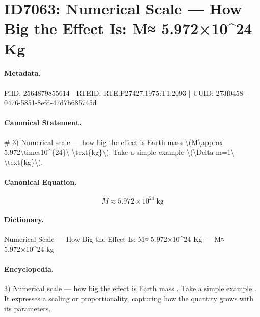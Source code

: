 \section*{ID7063: Numerical Scale — How Big the Effect Is: M≈ 5.972×10\textasciicircum{}24 Kg}
\paragraph{Metadata.}
PiID: 2564879855614 | RTEID: RTE:P27427.1975:T1.2093 | UUID: 273f0458-0476-5851-8efd-47d7b685745d

\paragraph{Canonical Statement.}
\# 3) Numerical scale — how big the effect is Earth mass \textbackslash{}(M\textbackslash{}approx 5.972\textbackslash{}times10\textasciicircum{}\{24\}\textbackslash{} \textbackslash{}text\{kg\}\textbackslash{}). Take a simple example \textbackslash{}(\textbackslash{}Delta m=1\textbackslash{} \textbackslash{}text\{kg\}\textbackslash{}).

\paragraph{Canonical Equation.}
\[
M\approx 5.972\times10^{24}\ \text{kg}
\]

\paragraph{Dictionary.}
Numerical Scale — How Big the Effect Is: M≈ 5.972×10\textasciicircum{}24 Kg — M≈ 5.972×10\textasciicircum{}24 kg

\paragraph{Encyclopedia.}
3) Numerical scale — how big the effect is Earth mass . Take a simple example . It expresses a scaling or proportionality, capturing how the quantity grows with its parameters.
